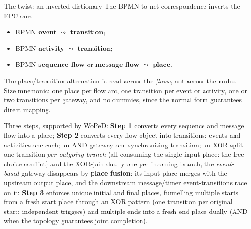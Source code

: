 \begin{notebox}{The twist: an inverted dictionary}
The BPMN-to-net correspondence inverts the EPC one:
\begin{itemize}
  \item BPMN \textbf{event} $\leadsto$ \textbf{transition};
  \item BPMN \textbf{activity} $\leadsto$ \textbf{transition};
  \item BPMN \textbf{sequence flow} or \textbf{message flow} $\leadsto$ \textbf{place}.
\end{itemize}
The place/transition alternation is read across the \emph{flows}, not across the nodes. Size mnemonic: one place per flow arc, one transition per event or activity, one or two transitions per gateway, and no dummies, since the normal form guarantees direct mapping.
\end{notebox}

Three steps, supported by WoPeD: \textbf{Step 1} converts every sequence and message flow into a place; \textbf{Step 2} converts every flow object into transitions: events and activities one each; an \textsf{AND} gateway one synchronising transition; an \textsf{XOR}-split one transition \emph{per outgoing branch} (all consuming the single input place: the free-choice conflict) and the \textsf{XOR}-join dually one per incoming branch; the \emph{event-based} gateway disappears by \textbf{place fusion}: its input place merges with the upstream output place, and the downstream message/timer event-transitions race on it; \textbf{Step 3} enforces unique initial and final places, funnelling multiple starts from a fresh \textsf{start} place through an XOR pattern (one transition per original start: independent triggers) and multiple ends into a fresh \textsf{end} place dually (AND when the topology guarantees joint completion).

